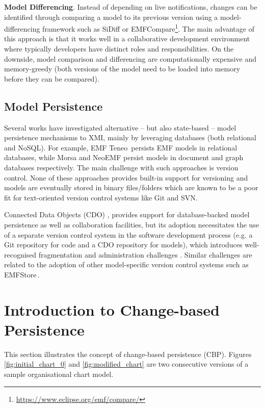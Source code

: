 \documentclass[12pt, a4paper]{report} \usepackage[titletoc]{appendix}
\begin{document}
\textbf{Model Differencing}. Instead of depending on live notifications, changes can be identified through comparing a model to its previous version using a model-differencing framework such as SiDiff \cite{kelter2005generic} or EMFCompare\footnote{\url{https://www.eclipse.org/emf/compare/}}. The main advantage of this approach is that it works well in a collaborative development environment where typically developers have distinct roles and responsibilities. On the downside, model comparison and differencing are computationally expensive and memory-greedy (both versions of the model need to be loaded into memory before they can be compared).

\subsection{Model Persistence}
\label{subsec:model_persistence}
Several works have investigated alternative -- but also state-based -- model persistence mechanisms to XMI, mainly by leveraging databases (both relational and NoSQL). For example, EMF Teneo\,\cite{eclipse2017teneo} persists EMF models in relational databases, while Morsa \cite{pagan2011morsa} and NeoEMF \cite{daniel2016neoemf} persist models in document and graph databases respectively. The main challenge with such approaches is version control. None of these approaches provides built-in support for versioning and models are eventually stored in binary files/folders which are known to be a poor fit for text-oriented version control systems like Git and SVN.

Connected Data Objects (CDO) \cite{eclipse2017cdo}, provides support for database-backed model persistence as well as collaboration facilities, but its adoption necessitates the use of a separate version control system in the software development process (e.g. a Git repository for code and a CDO repository for models), which introduces well-recognised fragmentation and administration challenges \cite{barmpis2014evaluation}. Similar challenges are related to the adoption of other model-specific version control systems such as EMFStore\,\cite{koegel2010emfstore}.

\section{Introduction to Change-based Persistence}
\label{sec:introduction_to_change-based_persistence}
This section illustrates the concept of change-based persistence (CBP). Figures \ref{fig:initial_chart_0} and \ref{fig:modified_chart} are two consecutive versions of a sample organisational chart model. 
\end{document}
